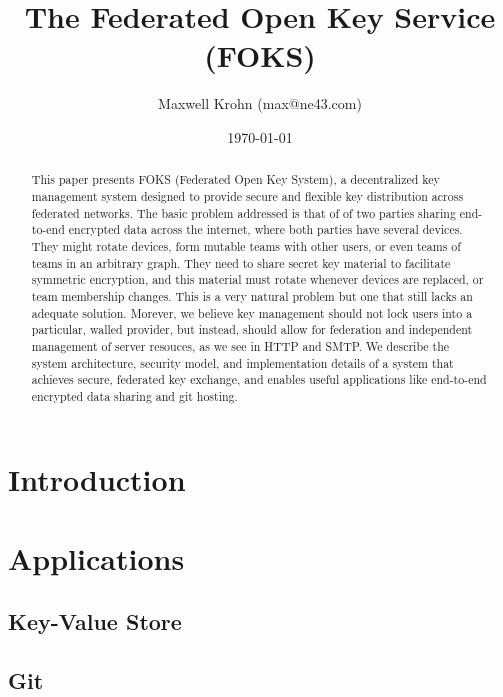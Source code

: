 \documentclass[11pt]{article}
\title{The Federated Open Key Service (FOKS)}
\author{Maxwell Krohn (max@ne43.com)}
\date{\today}
\begin{document}
\maketitle

\begin{abstract}

This paper presents FOKS (Federated Open Key System), a
decentralized key management system designed to provide secure and flexible key
distribution across federated networks. The basic problem addressed is that of
of two parties sharing end-to-end encrypted data across the internet, where both
parties have several devices. They might rotate devices, form mutable teams with
other users, or even teams of teams in an arbitrary graph. They need to share
secret key material to facilitate symmetric encryption, and this material must
rotate whenever devices are replaced, or team membership changes.  This is a
very natural problem but one that still lacks an adequate solution.  Morever, we
believe key management should not lock users into a particular, walled provider,
but instead, should allow for federation and independent management of server
resouces, as we see in HTTP and SMTP.  We describe the system architecture,
security model, and implementation details of a system that achieves secure,
federated key exchange, and enables useful applications like end-to-end
encrypted data sharing and git hosting.

\end{abstract}


\section{Introduction}





\section{Applications}

\subsection{Key-Value Store}

\subsection{Git}
\end{document}
